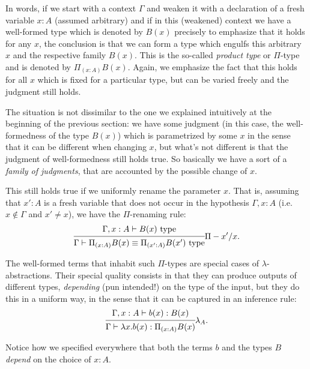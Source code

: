 In words, if we start with a context $ \Gamma $ and weaken it with
a declaration of a fresh variable $ x : A $ (assumed arbitrary)
and if in this (weakened) context we have a well-formed type
which is denoted by $ B(x) $ precisely to emphasize that it holds for
any $ x $, the conclusion is that we can form a type which engulfs
this arbitrary $ x $ and the respective family $ B(x) $. This is the
so-called \emph{product type} or $ \Pi $-type and is denoted by
$ \Pi_{(x : A)} B(x) $. Again, we emphasize the fact that this holds
for all $ x $ which is fixed for a particular type, but can be varied
freely and the judgment still holds.

The situation is not dissimilar to the one we explained intuitively at
the beginning of the previous section: we have some judgment (in this case,
the well-formedness of the type $ B(x) $) which is parametrized by
some $ x $ in the sense that it can be different when changing $ x $,
but what's not different is that the judgment of well-formedness
still holds true. So basically we have a sort of a \emph{family of %
  judgments}, that are accounted by the possible change of $ x $.

This still holds true if we uniformly rename the parameter $ x $.
That is, assuming that $ x' : A $ is a fresh variable that does not
occur in the hypothesis $ \Gamma, x : A $ (i.e.\ $ x \notin \Gamma $
and $ x' \neq x $), we have the $ \Pi $-renaming rule:
\[
  \begin{prooftree}
    \hypo{\Gamma, x : A \vdash B(x) \text{ type}}
    \infer1{\Gamma \vdash \Pi_{(x : A)} B(x) \equiv %
      \Pi_{(x' : A)} B(x') \text{ type}}
  \end{prooftree} \Pi-x'/x.
\]

The well-formed terms that inhabit such $ \Pi $-types are special cases
of $ \lambda $-abstractions. Their special quality consists in that they
can produce outputs of different types, \emph{depending} (pun intended!)
on the type of the input, but they do this in a uniform way, in the sense
that it can be captured in an inference rule:
\[
  \begin{prooftree}
    \hypo{\Gamma, x : A \vdash b(x) : B(x)}
    \infer1{\Gamma \vdash \lambda x.b(x) : \Pi_{(x : A)} B(x)}
  \end{prooftree} \lambda_A.
\]

Notice how we specified everywhere that both the terms $ b $ and the
types $ B $ \emph{depend} on the choice of $ x : A $.


